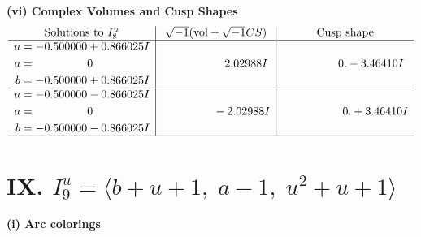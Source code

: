 \documentclass[1p]{elsarticle_modified}
\theoremstyle{definition}
\newcommand{\I}{\sqrt{-1}}
\begin{document}
\newpage\flushleft \textbf{(vi) Complex Volumes and Cusp Shapes}
$$\begin{array}{c|c|c}  
\text{Solutions to }I^u_{8}& \I (\text{vol} + \sqrt{-1}CS) & \text{Cusp shape}\\
 \hline 
\begin{aligned}
u &= -0.500000 + 0.866025 I \\
a &= \phantom{-0.000000 } 0 \\
b &= -0.500000 + 0.866025 I\end{aligned}
 & \phantom{-0.000000 -}2.02988 I & \phantom{-0.000000 } 0. - 3.46410 I \\ \hline\begin{aligned}
u &= -0.500000 - 0.866025 I \\
a &= \phantom{-0.000000 } 0 \\
b &= -0.500000 - 0.866025 I\end{aligned}
 & \phantom{-0.000000 } -2.02988 I & \phantom{-0.000000 -}0. + 3.46410 I\\
 \hline 
 \end{array}$$\newpage\newpage\renewcommand{\arraystretch}{1}
\centering \section*{IX. $I^u_{9}= \langle b+u+1,\;a-1,\;u^2+u+1 \rangle$}
\flushleft \textbf{(i) Arc colorings}\\
\end{document}
